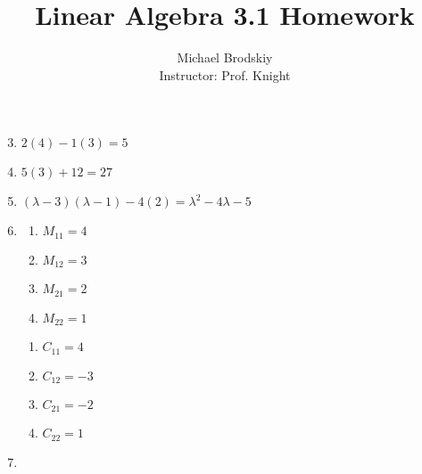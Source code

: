 \documentclass[12pt]{article}
\title{Linear Algebra 3.1 Homework}
\date{}
\author{Michael Brodskiy\\ \small Instructor: Prof. Knight}
\begin{document}
\maketitle

\begin{enumerate}


    \setcounter{enumi}{2}

  \item $2(4)-1(3)=5$

    \setcounter{enumi}{4}

  \item $5(3)+12= 27$

    \setcounter{enumi}{10}

  \item $(\lambda-3)(\lambda-1)-4(2)=\lambda^2 -4\lambda-5$

    \setcounter{enumi}{12}

  \item

    \begin{multicols}{2}

      \begin{enumerate}

        \item $M_{11}=4$

        \item $M_{12}=3$

        \item $M_{21}=2$

        \item $M_{22}=1$

      \end{enumerate}


      \begin{enumerate}

        \item $C_{11}=4$

        \item $C_{12}=-3$

        \item $C_{21}=-2$

        \item $C_{22}=1$

      \end{enumerate}

    \end{multicols}

    \setcounter{enumi}{14}

  \item


\end{enumerate}
\end{document}
